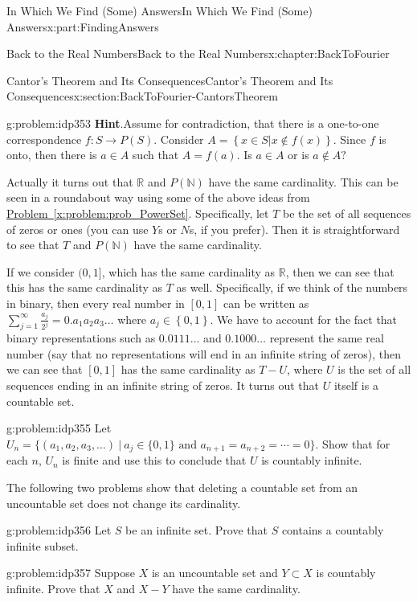 \documentclass[oneside,10pt,]{book}
\newcommand{\blocktitlefont}{\relax}
\newcommand{\xreffont}{\relax}
\numberwithin{equation}{section}
\newcommand{\RR}{\mathbb {R}}
\newcommand{\NN}{\mathbb {N}}
\begin{document}
\begin{partptx}{In Which We Find (Some) Answers}{}{In Which We Find (Some) Answers}{}{}{x:part:FindingAnswers}
\begin{chapterptx}{Back to the Real Numbers}{}{Back to the Real Numbers}{}{}{x:chapter:BackToFourier}
\begin{sectionptx}{Cantor's Theorem and Its Consequences}{}{Cantor's Theorem and Its Consequences}{}{}{x:section:BackToFourier-CantorsTheorem}
\begin{problem}{}{g:problem:idp353}
\noindent\textbf{\blocktitlefont Hint}.\hypertarget{g:hint:idp354}{}\quad{}Assume for contradiction, that there is a one-to-one correspondence \(f:S\rightarrow P(S)\). Consider \(A=\left\{x\in S|x\not\in f(x)\right\}\). Since \(f\) is onto, then there is \(a\in A\) such that \(A=f(a)\).  Is \(a\in A\) or is \(a\not\in
A?\)%
\end{problem}
Actually it turns out that \(\RR\) and \(P(\NN)\) have the same cardinality. This can be seen in a roundabout way using some of the above ideas from \hyperref[x:problem:prob_PowerSet]{Problem~{\xreffont\ref{x:problem:prob_PowerSet}}}. Specifically, let \(T\) be the set of all sequences of zeros or ones (you can use \(Y\)s or \(N\)s, if you prefer). Then it is straightforward to see that \(T\) and \(P(\NN)\) have the same cardinality.%
\par
If we consider \((0,1]\), which has the same cardinality as \(\RR\), then we can see that this has the same cardinality as \(T\) as well. Specifically, if we think of the numbers in binary, then every real number in \([0,1]\) can be written as \(\sum_{j=1}^\infty \frac{a_j}{2^j} =0.a_1a_2a_3\ldots\) where \(a_j\in\left\{0,1\right\}\). We have to account for the fact that binary representations such as \(0.0111\ldots\) and \(0.1000\ldots\) represent the same real number (say that no representations will end in an infinite string of zeros), then we can see that \([0,1]\) has the same cardinality as \(T-U\), where \(U\) is the set of all sequences ending in an infinite string of zeros. It turns out that \(U\) itself is a countable set.%
\begin{problem}{}{g:problem:idp355}%
 Let \(U_n=\{(a_1,a_2,a_3,\ldots)\ |\ a_j\in \{0,1\} \text{ and } a_{n+1}=a_{n+2}=\cdots=0\}\). Show that for each \(n\), \(U_n\) is finite and use this to conclude that \(U\) is countably infinite.%
\end{problem}
The following two problems show that deleting a countable set from an uncountable set does not change its cardinality.%
\begin{problem}{}{g:problem:idp356}%
 Let \(S\) be an infinite set. Prove that \(S\) contains a countably infinite subset.%
\end{problem}
\begin{problem}{}{g:problem:idp357}%
Suppose \(X\) is an uncountable set and \(Y\subset X\) is countably infinite.  Prove that \(X\) and \(X-Y\) have the same cardinality.%
\par\smallskip%

\end{problem}
\end{sectionptx}
\end{chapterptx}
\end{partptx}
\end{document}
